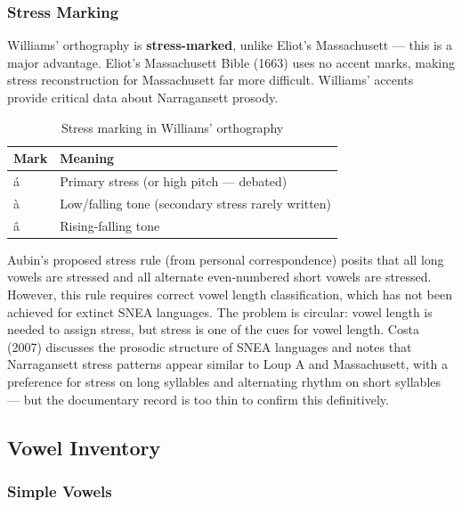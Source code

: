 \subsubsection{Stress Marking}

Williams' orthography is \textbf{stress-marked}, unlike Eliot's Massachusett
--- this is a major advantage. Eliot's Massachusett Bible (1663) uses no
accent marks, making stress reconstruction for Massachusett far more difficult.
Williams' accents provide critical data about Narragansett prosody.

\begin{table}[h]
\centering
\begin{tabular}{ll}
\toprule
Mark & Meaning \\
\midrule
á & Primary stress (or high pitch --- debated) \\
à & Low/falling tone (secondary stress rarely written) \\
â & Rising-falling tone \\
\bottomrule
\end{tabular}
\caption{Stress marking in Williams' orthography}
\label{tab:1362-stress}
\end{table}

Aubin's proposed stress rule (from personal correspondence) posits that all
long vowels are stressed and all alternate even-numbered short vowels are
stressed. However, this rule requires correct vowel length classification,
which has not been achieved for extinct SNEA languages. The problem is
circular: vowel length is needed to assign stress, but stress is one of the
cues for vowel length. Costa (2007) discusses the prosodic structure of SNEA
languages and notes that Narragansett stress patterns appear similar to Loup A
and Massachusett, with a preference for stress on long syllables and
alternating rhythm on short syllables --- but the documentary record is too
thin to confirm this definitively.

\subsection{Vowel Inventory}

\subsubsection{Simple Vowels}


